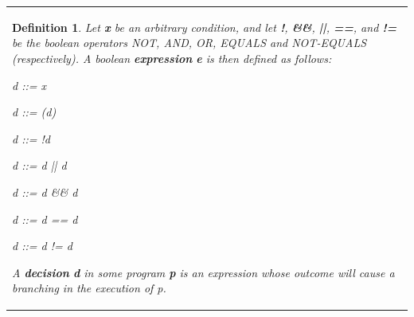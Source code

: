 \documentclass{article}
\newcommand{\tmem}[1]{{\em #1\/}}
\newcommand{\tmstrong}[1]{\textbf{#1}}
\newenvironment{tmparmod}[3]{\begin{list}{}{\setlength{\topsep}{0pt}\setlength{\leftmargin}{#1}\setlength{\rightmargin}{#2}\setlength{\parindent}{#3}\setlength{\listparindent}{\parindent}\setlength{\itemindent}{\parindent}\setlength{\parsep}{\parskip}} \item[]}{\end{list}}
\newtheorem{definition}{Definition}
{\theorembodyfont{\rmfamily}\newtheorem{example}{Example}}
\begin{document}
\begin{flushleft}
  \begin{tmparmod}{1cm}{0pt}{0pt}
    \begin{tmparmod}{0pt}{1cm}{0pt}
      {\noindent}{\noindent}\begin{tabular}{l}
        \begin{definition}
          
          
          
          
          Let {\tmem{{\tmstrong{x}}{\tmstrong{}}}} be an arbitrary condition,
          and let {\tmstrong{!}}, {\tmstrong{\&\&}}, {\tmstrong{||}},
          {\tmstrong{==}}, and {\tmstrong{!=}} be the boolean operators NOT,
          AND, OR, EQUALS and NOT-EQUALS (respectively). A boolean
          {\tmstrong{expression}} {\tmem{{\tmstrong{e}}}} is then defined as
          follows:
          
          
          
          d ::= x
          
          d ::= (d)
          
          d ::= !d
          
          d ::= d || d
          
          d ::= d \&\& d
          
          d ::= d == d
          
          d ::= d != d
          
          
          
          A {\tmstrong{decision}} {\tmstrong{{\tmem{d}}}} in some program
          {\tmem{{\tmstrong{p}}}} is an expression whose outcome will cause a
          branching in the execution of p.
        \end{definition}
      \end{tabular}{\hspace*{\fill}}{\smallskip}
    \end{tmparmod}
  \end{tmparmod}
\end{flushleft}
\end{document}
